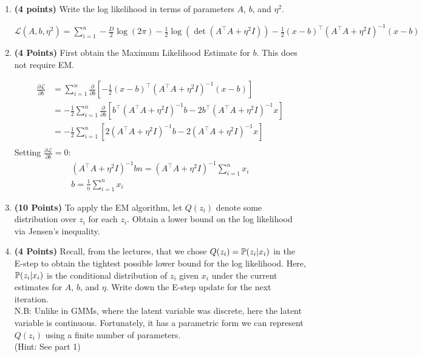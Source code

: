 \begin{enumerate}
\item \textbf{(4 points)}
Write the log likelihood in terms of parameters $A$, $b$, and $\eta^2$.

\begin{soln}
  $\mathcal{L}(A, b, \eta^2) = \sum_{i=1}^{n} -\frac{D}{2} \log(2 \pi) -\frac{1}{2} \log(\det(A^\top A + \eta^2 I)) -\frac{1}{2} (x-b)^\top (A^\top A + \eta^2 I)^{-1} (x-b)$
\end{soln}

\item \textbf{(4 Points)}
First obtain the Maximum Likelihood Estimate for $b$. This does not require EM.

\begin{soln}
  $$
  \begin{aligned}
    \frac{\partial \mathcal{L}}{\partial b} & = \sum_{i=1}^{n} \frac{\partial}{\partial b} \left[-\frac{1}{2} (x-b)^\top (A^\top A + \eta^2 I)^{-1} (x-b)\right] \\
    & = -\frac{1}{2} \sum_{i=1}^{n} \frac{\partial}{\partial b} \left[b^\top (A^\top A + \eta^2 I)^{-1} b - 2b^\top(A^\top A + \eta^2 I)^{-1}x \right] \\
    & = -\frac{1}{2} \sum_{i=1}^{n} \left[2 (A^\top A + \eta^2 I)^{-1} b - 2(A^\top A + \eta^2 I)^{-1}x \right] \\
  \end{aligned}
  $$
  Setting $\frac{\partial \mathcal{L}}{\partial b} = 0$:
  \begin{gather*}
    (A^\top A + \eta^2 I)^{-1} bn = (A^\top A + \eta^2 I)^{-1} \sum_{i=1}^{n} x_i \\
    b = \frac{1}{n} \sum_{i=1}^{n} x_i
  \end{gather*}
\end{soln}

\item \textbf{(10 Points)}
To apply the EM algorithm,
let $Q(z_i)$  denote some distribution over $z_i$ for each $z_i$.
Obtain a lower bound on the log likelihood via Jensen's inequality.

\item \textbf{(4 Points)}
Recall, from the lectures, that we chose
$Q(z_i) =  \mathbb{P}(z_i|x_i)$ in the E-step to obtain the tightest
possible lower bound for the log likelihood.
Here, $ \mathbb{P}(z_i|x_i)$ is the conditional distribution of $z_i$
given $x_i$ under the current estimates for $A$, $b$, and $\eta$.
Write down the E-step update for the next iteration. \\
N.B: Unlike in GMMs, where the latent variable was discrete, here the latent variable is continuous. Fortunately, it has a parametric form we can represent $Q(z_i)$ using a finite number of parameters. \\
(Hint: See part 1)


\end{enumerate}
